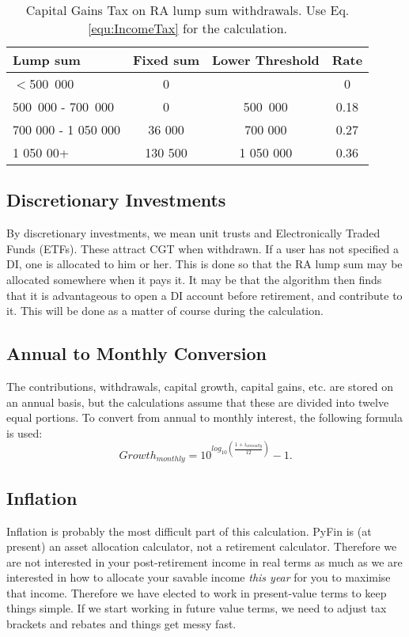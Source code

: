 \documentclass[a4paper, justified]{tufte-handout}
\begin{document}
\begin{table}[]
	\centering
	\caption{Capital Gains Tax on RA lump sum withdrawals. Use Eq.\ref{equ:IncomeTax} for the calculation.}
	\label{tab:CGTRA}
	\begin{tabular}{lccc}
		\toprule
		\textbf{Lump sum}  & \textbf{Fixed sum} & \textbf{Lower Threshold} & \textbf{Rate} \\
		\midrule
		$<$500~000            & 0         &          & 0 \\
		500~000 - 700~000  & 0    & 500~000         & 0.18 \\
		700 000 - 1 050 000  & 36 000   & 700 000          & 0.27  \\
		1 050 00+  & 130 500   & 1 050 000      & 0.36  \\
		\bottomrule
	\end{tabular}
\end{table}

\subsection{Discretionary Investments}
By discretionary investments, we mean unit trusts and Electronically Traded Funds (ETFs). These attract CGT when withdrawn. If a user has not specified a DI, one is allocated to him or her. This is done so that the RA lump sum may be allocated somewhere when it pays it. It may be that the algorithm then finds that it is advantageous to open a DI account before retirement, and contribute to it. This will be done as a matter of course during the calculation.

\subsection{Annual to Monthly Conversion}
The contributions, withdrawals, capital growth, capital gains, etc. are stored on an annual basis, but the calculations assume that these are divided into twelve equal portions. To convert from annual to monthly interest, the following formula is used:
\begin{equation}
Growth_{monthly} = 10^{log_{10}\left(\frac{1 +i_{annually}}{12}\right)} - 1.
\end{equation}

\subsection{Inflation}
Inflation is probably the most difficult part of this calculation. PyFin is (at present) an asset allocation calculator, not a retirement calculator. Therefore we are not interested in your post-retirement income in real terms as much as we are interested in how to allocate your savable income \textit{this year} for you to maximise that income. Therefore we have elected to work in present-value terms to keep things simple. If we start working in future value terms, we need to adjust tax brackets and rebates and things get messy fast.
\end{document}
